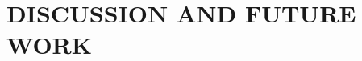 \documentclass[dissertation,copyright,committeedraft,numbers,sort&compress,gsmodern]{uothesis}
\theoremstyle{definition}
\theoremstyle{definition}
\begin{document}

\chapter{DISCUSSION AND FUTURE WORK}
\label{chap:discussion}


%
%
%

%



\end{document}
